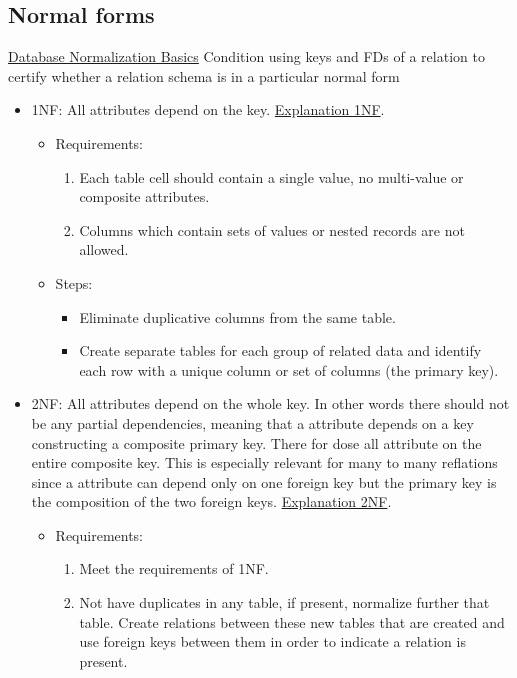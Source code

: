 \begin{multicols}{2}
\subsection{Normal forms}
\href{https://www.lifewire.com/database-normalization-basics-1019735}{Database Normalization Basics}
Condition using keys and FDs of a relation to
certify whether a relation schema is in a particular
normal form
\begin{itemize}
    \item 1NF: All attributes depend on the key. \href{https://www.youtube.com/watch?v=mUtAPbb1ECM}{Explanation 1NF}. 
    \begin{itemize}
        \item Requirements:
        \begin{enumerate}
            \item Each table cell should contain a single value, no multi-value or composite attributes.
            \item Columns which contain sets of values or nested records are not allowed.
        \end{enumerate}
        \item Steps:
        \begin{itemize}
            \item Eliminate duplicative columns from the same table.
            \item Create separate tables for each group of related data and identify each row with a unique column or set of columns (the primary key).
        \end{itemize}
    \end{itemize}
    \item 2NF: All attributes depend on the whole key. In other words
    there should not be any partial dependencies, meaning that a attribute
    depends on a key constructing a composite primary key. There for dose all 
    attribute on the entire composite key. This is especially relevant for 
    many to many reflations since a attribute can depend only on one foreign key 
    but the primary key is the composition of the two foreign keys.
    \href{https://www.youtube.com/watch?v=R7UblSu4744}{Explanation 2NF}.
    \begin{itemize}
        \item Requirements:
        \begin{enumerate}
            \item Meet the requirements of 1NF.
            \item Not have duplicates in any table, if present, normalize further that table. Create relations between these new tables that are created and use foreign keys between them in order to indicate a relation is present. 

\end{enumerate}
\end{itemize}
\end{itemize}
\end{multicols}
